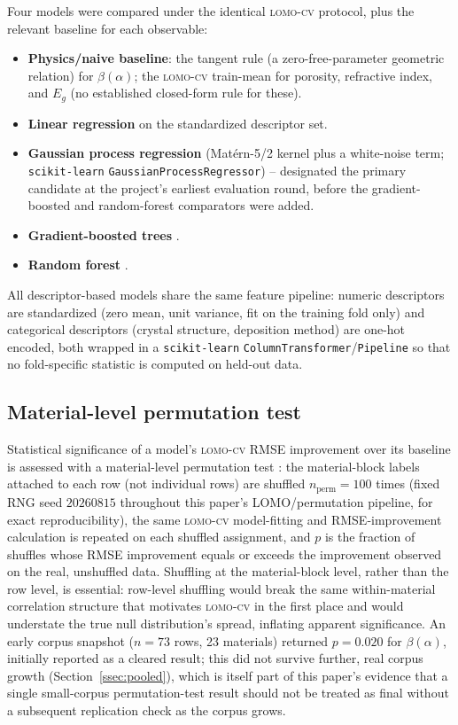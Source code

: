 \documentclass[aip,amsmath,amssymb,reprint]{revtex4-1}
\newcommand{\lomo}{\textsc{lomo-cv}}
\begin{document}
Four models were compared under the identical \lomo{} protocol, plus
the relevant baseline for each observable:
\begin{itemize}
  \item \textbf{Physics/naive baseline}: the tangent rule (a
    zero-free-parameter geometric relation) for $\beta(\alpha)$; the
    \lomo{} train-mean for porosity, refractive index, and $E_g$
    (no established closed-form rule for these).
  \item \textbf{Linear regression} on the standardized descriptor set.
  \item \textbf{Gaussian process regression} (Mat\'{e}rn-5/2 kernel plus
    a white-noise term; \texttt{scikit-learn}
    \texttt{GaussianProcessRegressor}) \citep{rasmussen2006gp,%
    pedregosa2011sklearn} -- designated the primary candidate at the
    project's earliest evaluation round, before the gradient-boosted
    and random-forest comparators were added.
  \item \textbf{Gradient-boosted trees}
    \citep{friedman2001gbm,pedregosa2011sklearn}.
  \item \textbf{Random forest} \citep{breiman2001randomforest,%
    pedregosa2011sklearn}.
\end{itemize}
All descriptor-based models share the same feature pipeline: numeric
descriptors are standardized (zero mean, unit variance, fit on the
training fold only) and categorical descriptors (crystal structure,
deposition method) are one-hot encoded, both wrapped in a
\texttt{scikit-learn} \texttt{ColumnTransformer}/\texttt{Pipeline} so
that no fold-specific statistic is computed on held-out data.

\subsection{Material-level permutation test}
\label{ssec:permutation}

Statistical significance of a model's \lomo{} RMSE improvement over
its baseline is assessed with a material-level permutation test
\citep{ojala2010permutation}: the
material-block labels attached to each row (not individual rows) are
shuffled $n_{\mathrm{perm}}=100$ times (fixed RNG seed $20260815$
throughout this paper's LOMO/permutation pipeline, for exact
reproducibility), the same \lomo{} model-fitting
and RMSE-improvement calculation is repeated on each shuffled
assignment, and $p$ is the fraction of shuffles whose RMSE improvement
equals or exceeds the improvement observed on the real, unshuffled
data. Shuffling at the material-block level, rather than the row
level, is essential: row-level shuffling would break the same
within-material correlation structure that motivates \lomo{} in the
first place and would understate the true null distribution's spread,
inflating apparent significance. An early corpus snapshot ($n=73$
rows, 23 materials) returned $p=0.020$ for $\beta(\alpha)$, initially
reported as a cleared result; this did not survive further, real
corpus growth (Section~\ref{ssec:pooled}), which is itself part of
this paper's evidence that a single small-corpus permutation-test
result should not be treated as final without a subsequent replication
check as the corpus grows.
\end{document}
